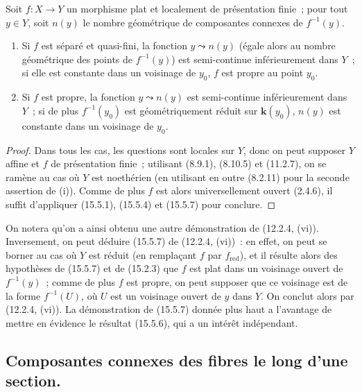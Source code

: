\begin{proposition}[15.5.9]
\label{IV.15.5.9-fr}
Soit $f:X\to Y$ un morphisme plat et localement de présentation finie~; pour tout $y\in Y$, soit $n(y)$ le nombre géométrique de composantes connexes de $f^{-1}(y)$.
\begin{enumerate}[label=\emph{(\roman*)}]
  \item Si $f$ est séparé et quasi-fini, la fonction $y\leadsto n(y)$ \textup{(égale alors au nombre géométrique des points de $f^{-1}(y)$)} est semi-continue inférieurement dans $Y$~; si elle est constante dans un voisinage de $y_0$, $f$ est propre au point $y_0$.
  \item Si $f$ est propre, la fonction $y\leadsto n(y)$ est semi-continue inférieurement dans $Y$~; si de plus $f^{-1}(y_0)$ est géométriquement réduit sur $\boldsymbol{k}(y_0)$, $n(y)$ est constante dans un voisinage de $y_0$.
\end{enumerate}
\end{proposition}

\begin{proof}
Dans tous les cas, les questions sont locales sur $Y$, donc on peut supposer $Y$ affine et $f$ de présentation finie~; utilisant (8.9.1), (8.10.5) et (11.2.7), on se ramène au cas où $Y$ est noethérien (en utilisant en outre (8.2.11) pour la seconde assertion de (i)). Comme de plus $f$ est alors universellement ouvert (2.4.6), il suffit d'appliquer (15.5.1), (15.5.4) et (15.5.7) pour conclure.
\end{proof}

\begin{remark}[15.5.10]
\label{IV.15.5.10-fr}
On notera qu'on a ainsi obtenu une autre démonstration de (12.2.4, (vi)). Inversement, on peut déduire (15.5.7) de (12.2.4, (vi))~: en effet, on peut se borner au cas où $Y$ est réduit (en remplaçant $f$ par $f_{\mathrm{red}}$), et il résulte alors des hypothèses de (15.5.7) et de (15.2.3) que $f$ est plat dans un voisinage ouvert de $f^{-1}(y)$~; comme de plus $f$ est propre, on peut supposer que ce voisinage est de la forme $f^{-1}(U)$, où $U$ est un voisinage ouvert de $y$ dans $Y$. On conclut alors par (12.2.4, (vi)). La démonstration de (15.5.7) donnée plus haut a l'avantage de mettre en évidence le résultat (15.5.6), qui a un intérêt indépendant.
\end{remark}


\subsection{Composantes connexes des fibres le long d'une section.}
\label{subsection:IV.15.6-fr}

